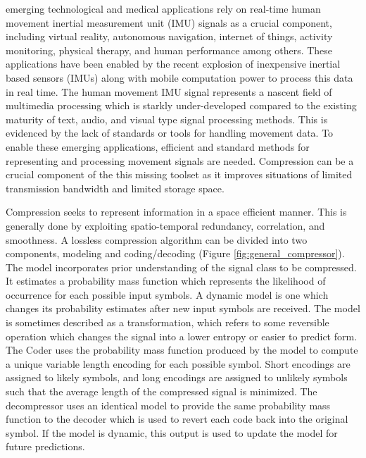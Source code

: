 \documentclass[journal]{IEEEtran}
\begin{document}
 emerging technological and medical applications rely on real-time human movement inertial measurement unit (IMU) signals as a crucial component, including virtual reality\cite{Ahmad2013}, autonomous navigation\cite{Campbell2018}, internet of things\cite{Fernandez-Carames2018}, activity monitoring\cite{Yang2010}\cite{Filippeschi2017}, physical therapy\cite{Patel2012}\cite{Shull2014}, and human performance\cite{Camomilla2018}\cite{GobinathAroganam2019} among others. These applications have been enabled by the recent explosion of inexpensive inertial based sensors (IMUs) along with mobile computation power to process this data in real time. The human movement IMU signal represents a nascent field of multimedia processing which is starkly under-developed compared to the existing maturity of text, audio, and visual type signal processing methods. This is evidenced by the lack of standards or tools for handling movement data. To enable these emerging applications, efficient and standard methods for representing and processing movement signals are needed. Compression can be a crucial component of the this missing toolset as it improves situations of limited transmission bandwidth and limited storage space.

Compression seeks to represent information in a space efficient manner. This is generally done by exploiting spatio-temporal redundancy, correlation, and smoothness\cite{Sayood2006}. A lossless compression algorithm can be divided into two components, modeling and coding/decoding (Figure \ref{fig:general_compressor})\cite{Nelson1996}. The model incorporates prior understanding of the signal class to be compressed. It estimates a probability mass function which represents the likelihood of occurrence for each possible input symbols. A dynamic model is one which changes its probability estimates after new input symbols are received. The model is sometimes described as a transformation, which refers to some reversible operation which changes the signal into a lower entropy or easier to predict form.  The Coder uses the probability mass function produced by the model to compute a unique variable length encoding for each possible symbol. Short encodings are assigned to likely symbols, and long encodings are assigned to unlikely symbols such that the average length of the compressed signal is minimized. The decompressor uses an identical model to provide the same probability mass function to the decoder which is used to revert each code back into the original symbol. If the model is dynamic, this output is used to update the model for future predictions.
\end{document}
